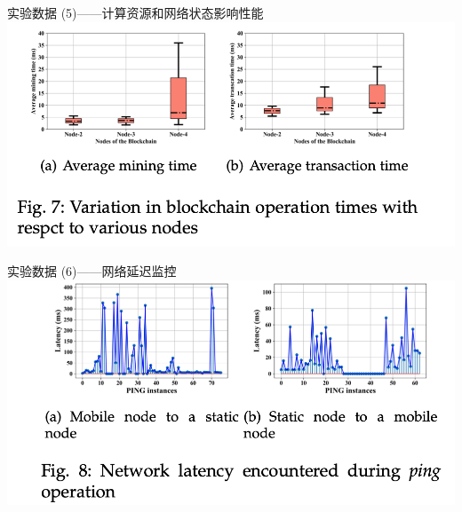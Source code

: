 \documentclass{beamer}
\begin{document}
\begin{frame}{实验数据 (5)——计算资源和网络状态影响性能}
	\includegraphics[width=\linewidth]{Assets/图7}
\end{frame}

\begin{frame}{实验数据 (6)——网络延迟监控}
	\includegraphics[width=\linewidth]{Assets/图8}
\end{frame}
\end{document}
